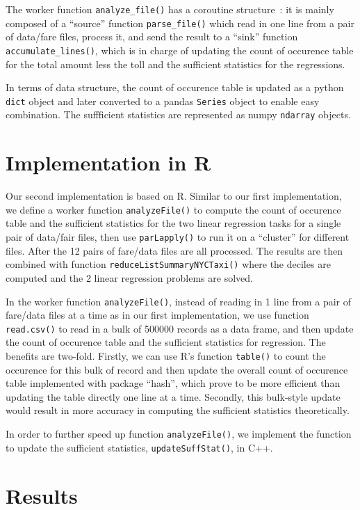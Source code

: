 \documentclass{article}
\begin{document}
The worker function \texttt{analyze\_file()} has a coroutine
structure~\cite{}: it is mainly composed of a ``source'' function
\texttt{parse\_file()} which read in one line from a pair of data/fare files,
process it, and send the result to a ``sink'' function
\texttt{accumulate\_lines()}, which is in charge of updating the count of
occurence table for the total amount less the toll and the sufficient statistics
for the regressions.

In terms of data structure, the count of occurence table is updated as a python
\texttt{dict} object and later converted to a pandas \texttt{Series} object to
enable easy combination. The suffficient statistics are represented as numpy
\texttt{ndarray} objects.

\section{Implementation in R}
Our second implementation is based on R. Similar to our first implementation,
we define a worker function \texttt{analyzeFile()} to compute the count of
occurence table and the sufficient statistics for the two linear regression
tasks for a single pair of data/fair files, then use \texttt{parLapply()} to run
it on a ``cluster'' for different files. After the 12 pairs of fare/data files
are all processed. The results are then combined with function
\texttt{reduceListSummaryNYCTaxi()} where the deciles are computed and the 2
linear regression problems are solved.

In the worker function \texttt{analyzeFile()}, instead of reading in 1 line from
a pair of fare/data files at a time as in our first implementation, we use
function \texttt{read.csv()} to read in a bulk of 500000 records as a data
frame, and then update the count of occurence table and the sufficient statistics for
regression. The benefits are two-fold. Firstly, we can use R's function
\texttt{table()} to count the occurence for this bulk of record and then update
the overall count of occurence table implemented with package ``hash'', which
prove to be more efficient than updating the table directly one line at a time.
Secondly, this bulk-style update would result in more accuracy in computing the
sufficient statistics theoretically.

In order to further speed up function \texttt{analyzeFile()}, we implement the
function to update the sufficient statistics, \texttt{updateSuffStat()}, in C++.

\section{Results}
\end{document}
